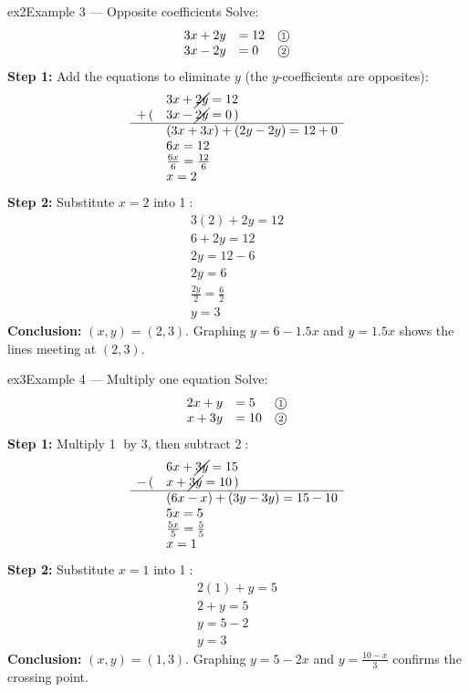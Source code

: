 \documentclass[11pt]{article}
\begin{document}
\begin{example}{ex2}{Example 3 --- Opposite coefficients}
Solve:\[\begin{array}{rll} 3x+2y & = 12 & \text{\textcircled{\scriptsize 1}}\\ 3x-2y & = 0 & \text{\textcircled{\scriptsize 2}} \end{array}\]\soln
\textbf{Step 1:} Add the equations to eliminate $y$ (the $y$-coefficients are opposites):\[\begin{array}{rl} & 3x+\cancel{2y}=12\\ +\,( & 3x-\cancel{2y}=0\,)\\ \hline & (3x+3x)+(2y-2y)=12+0\\ & 6x=12\\ & \frac{6x}{6}=\frac{12}{6}\\ & x=2 \end{array}\]
\textbf{Step 2:} Substitute $x=2$ into \textcircled{\scriptsize 1}:\[\begin{array}{l} 3(2)+2y=12\\ 6+2y=12\\ 2y=12-6\\ 2y=6\\ \frac{2y}{2}=\frac{6}{2}\\ y=3 \end{array}\]
\textbf{Conclusion:} $(x,y)=(2,3)$.
Graphing $y=6-1.5x$ and $y=1.5x$ shows the lines meeting at $(2,3)$.
\end{example}

\begin{example}{ex3}{Example 4 --- Multiply one equation}
Solve:\[\begin{array}{rll} 2x+y & = 5 & \text{\textcircled{\scriptsize 1}}\\ x+3y & = 10 & \text{\textcircled{\scriptsize 2}} \end{array}\]\soln
\textbf{Step 1:} Multiply \textcircled{\scriptsize 1} by $3$, then subtract \textcircled{\scriptsize 2}:\[\begin{array}{rl} & 6x+\cancel{3y}=15\\ -\,( & x+\cancel{3y}=10\,)\\ \hline & (6x-x)+(3y-3y)=15-10\\ & 5x=5\\ & \frac{5x}{5}=\frac{5}{5}\\ & x=1 \end{array}\]
\textbf{Step 2:} Substitute $x=1$ into \textcircled{\scriptsize 1}:\[\begin{array}{l} 2(1)+y=5\\ 2+y=5\\ y=5-2\\ y=3 \end{array}\]
\textbf{Conclusion:} $(x,y)=(1,3)$.
Graphing $y=5-2x$ and $y=\tfrac{10-x}3$ confirms the crossing point.
\end{example}
\end{document}
